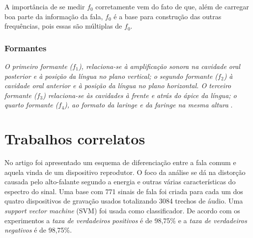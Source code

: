 \documentclass[a4paper,12pt,openright,oneside]{book}
\newenvironment{myenv}[1]
  {\begin{spacing}{#1}}
  {\end{spacing}}
\begin{document}
\begin{myenv}{1.5}
						\par A importância de se medir $f_0$ corretamente vem do fato de que, além de carregar boa parte da informação da fala, $f_0$ é a base para construção das outras frequências, pois essas são múltiplas de $f_0$.
						
						\subsubsection{Formantes}
						
						\par \textit{O primeiro formante ($f_1$), relaciona-se à  amplificação  sonora  na  cavidade  oral  posterior  e  à  posição  da  língua  no  plano  vertical;  o segundo  formante  ($f_2$)  à  cavidade  oral  anterior  e  à  posição  da  língua  no  plano  horizontal.  O terceiro  formante  ($f_3$)  relaciona-se  às  cavidades  à  frente  e  atrás  do  ápice  da  língua;  o  quarto formante  ($f_4$),  ao  formato  da  laringe  e  da  faringe  na  mesma  altura} \cite{valencca2014analise}.


		\section{Trabalhos correlatos}
			\par No artigo \cite{Ren2019} foi apresentado um esquema de diferenciação entre a fala comum e aquela vinda de um dispositivo reprodutor. O foco da análise se dá na distorção causada pelo alto-falante segundo a energia e outras várias características do espectro do sinal. Uma base com 771 sinais de fala foi criada para cada um dos quatro dispositivos de gravação usados totalizando 3084 trechos de áudio. Uma \textit{support vector machine} (SVM) foi usada como classificador. De  acordo com os experimentos a \textit{taxa de verdadeiros positivos} é de 98,75\% e a \textit{taxa de verdadeiros negativos} é de 98,75\%.
			

\end{myenv}
\end{document}

